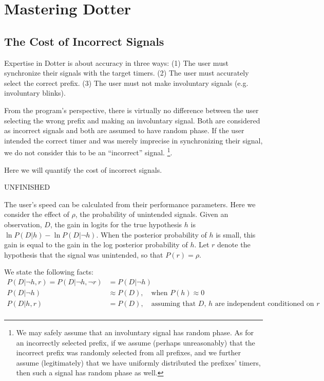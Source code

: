\chapter{Mastering Dotter}
\label{chap:practice}

\section{The Cost of Incorrect Signals}

Expertise in Dotter is about accuracy in three ways:
(1) The user must synchronize their signals with the target timers.
(2) The user must accurately select the correct prefix.
(3) The user must not make involuntary signals (e.g. involuntary blinks).

From the program's perspective, there is virtually no difference between the user selecting
the wrong prefix and making an involuntary signal. Both are considered as incorrect signals and both are assumed
to have random phase. If the user intended the correct timer and was merely imprecise in synchronizing their signal,
we do not consider this to be an ``incorrect'' signal.
\footnote{
    We may safely assume that an involuntary signal has random phase.
    As for an incorrectly selected prefix, if we assume (perhaps unreasonably) that
    the incorrect prefix was randomly selected from all prefixes, and we further assume (legitimately) that we 
    have uniformly distributed the prefixes' timers, then such a signal has random phase as well.
}.

Here we will quantify the cost of incorrect signals.

UNFINISHED

The user's speed can be calculated from their performance parameters.
Here we consider the effect of $\rho$, the probability of
unintended signals.
Given an observation, $D$, the gain in logits for the true hypothesis
$h$ is $\ln P(D | h) - \ln P(D | \neg h)$. When the posterior probability of
$h$ is small, this gain is equal to the gain in the log posterior probability
of $h$.
Let $r$ denote the hypothesis that the signal was unintended, so that
$P(r) = \rho$. 

We state the following facts:
\begin{align*}
P(D | \neg h, r) = P(D | \neg h, \neg r) &= P(D | \neg h) \\
P(D | \neg h) &\approx P(D), \quad \text{when } P(h) \approx 0 \\
P(D | h, r) &= P(D),  \quad \text{assuming that $D$, $h$ are independent conditioned on $r$} \\
\end{align*}

